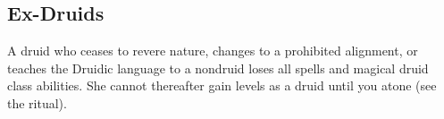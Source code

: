    \subsection{Ex-Druids}
        A druid who ceases to revere nature, changes to a prohibited alignment, or teaches the Druidic language to a nondruid loses all spells and magical druid class abilities.
        She cannot thereafter gain levels as a druid until you atone (see the  ritual).







